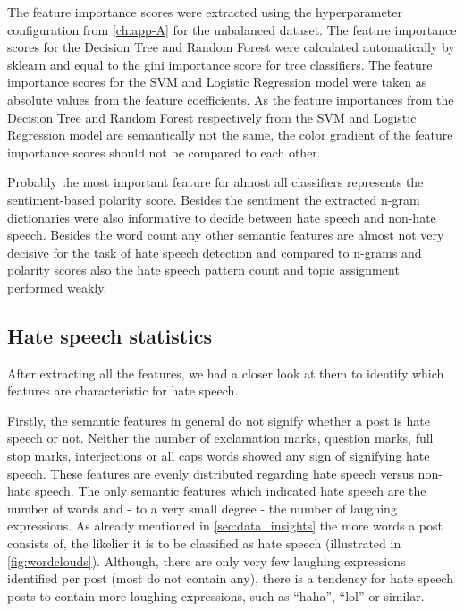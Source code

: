 The feature importance scores were extracted using the hyperparameter configuration from \ref{ch:app-A} for the unbalanced dataset. The feature importance scores for the Decision Tree and Random Forest were calculated automatically by sklearn and equal to the gini importance score for tree classifiers. The feature importance scores for the SVM and Logistic Regression model were taken as absolute values from the feature coefficients. As the feature importances from the Decision Tree and Random Forest respectively from the SVM and Logistic Regression model are semantically not the same, the color gradient of the feature importance scores should not be compared to each other.

Probably the most important feature for almost all classifiers represents the sentiment-based polarity score. Besides the sentiment the extracted n-gram dictionaries were also informative to decide between hate speech and non-hate speech. Besides the word count any other semantic features are almost not very decisive for the task of hate speech detection and compared to n-grams and polarity scores also the hate speech pattern count and topic assignment performed weakly. 

\subsection{Hate speech statistics}
\label{ch:experimentDb}

After extracting all the features, we had a closer look at them to identify which features are characteristic for hate speech.

Firstly, the semantic features in general do not signify whether a post is hate speech or not. Neither the number of exclamation marks, question marks, full stop marks, interjections or all caps words showed any sign of signifying hate speech. These features are evenly distributed regarding hate speech versus non-hate speech.
The only semantic features which indicated hate speech are the number of words and - to a very small degree - the number of laughing expressions.
As already mentioned in \autoref{sec:data_insights} the more words a post consists of, the likelier it is to be classified as hate speech (illustrated in \autoref{fig:wordclouds}).
Although, there are only very few laughing expressions identified per post (most do not contain any), there is a tendency for hate speech posts to contain more laughing expressions, such as \enquote{haha}, \enquote{lol} or similar.

\vspace{0.5cm}

